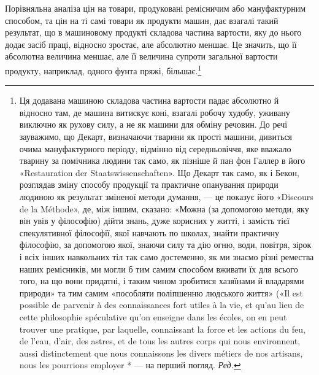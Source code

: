 Порівняльна аналіза цін на товари, продуковані ремісничим
або мануфактурним способом, та цін на ті самі товари як продукти
машин, дає взагалі такий результат, що в машиновому продукті
складова частина вартости, яку до нього додає засіб праці, відносно
зростає, але абсолютно меншає. Це значить, що її абсолютна
величина меншає, але її величина супроти загальної вартости
продукту, наприклад, одного фунта пряжі, більшає.\footnote{
Ця додавана машиною складова частина вартости падає абсолютно
й відносно там, де машина витискує коні, взагалі робочу худобу,
уживану виключно як рухову силу, а не як машини для обміну речовин.
До речі зауважимо, що Декарт, визначаючи тварини як прості машини,
дивиться очима мануфактурного періоду, відмінно від середньовіччя,
яке вважало тварину за помічника людини так само, як пізніше й пан
фон Галлер в його «Restauration der Staatswissenschaften». Що Декарт
так само, як і Бекон, розглядав зміну способу продукції та практичне
опанування природи людиною як результат зміненої методи думання, —
це показує його «Discours de la Méthode», де, між іншим, сказано: «Можна
(за допомогою методи, яку він увів у філософію) дійти знань, дуже корисних
у житті, і замість тієї спекулятивної філософії, якої навчають по школах,
знайти практичну філософію, за допомогою якої, знаючи силу та дію
огню, води, повітря, зірок і всіх інших навкольних тіл так само достеменно,
як ми знаємо різні ремества наших ремісників, ми могли б тим
самим способом вживати їх для всього того, на що вони придатні, і таким
чином зробитися хазяїнами й владарями природи» та тим самим «пособляти
поліпшенню людського життя» («Il est possible de parvenir à des connaissances
fort utiles à la vie, et qu'au lieu de cette philosophie spéculative
qu’on enseigne dans les écoles, on en peut trouver une pratique, par laquelle,
connaissant la force et les actions du feu, de l’eau, d’air, des astres, et de
tous les autres corps qui nous environnent, aussi distinctement que nous
connaissons les divers métiers de nos artisans, nous les pourrions employer
* — на перший погляд. \emph{Ред.}
}


